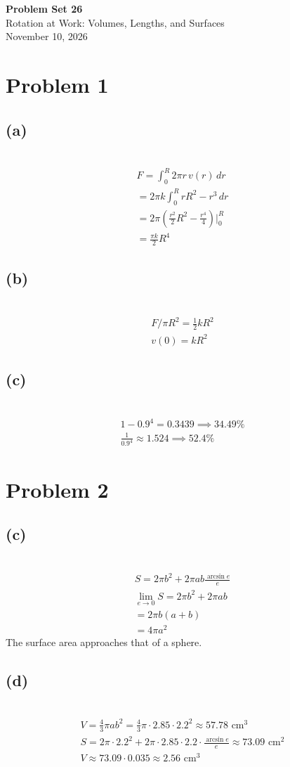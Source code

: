 \documentclass[12pt]{article}
\newcommand{\at}{\Big|}
\newcommand{\vem}{\vspace{0.5em}}
\newcommand{\problem}[1]{\section{Problem #1}}
\newcommand{\subproblem}[1]{\subsection{(#1)} \,}
\begin{document}
\vspace*{0cm}

\begin{center}
    {\Large \bfseries Problem Set 26} \\[0.5cm]
    {\large Rotation at Work: Volumes, Lengths, and Surfaces} \\[0.35cm]
    {\normalsize November 10, 2026}
\end{center}


\problem{1}

\subproblem{a}
\begin{gather*}
    F=\int_0^R 2\pi r \, v(r)\, dr\\
    = 2\pi k \int_0^R rR^2-r^3\, dr\\
    = 2\pi (\frac{r^2}{2}R^2-\frac{r^4}{4})\at_0^R\\
    = \boxed{\frac{\pi k}{2}R^4}
\end{gather*}

\subproblem{b}
\begin{gather*}
    F/\pi R^2 = \frac{1}{2}kR^2\\
    v(0)=kR^2 
\end{gather*}

\subproblem{c}
\begin{gather*}
    1-0.9^4=0.3439 \implies 34.49 \%\\
    \frac{1}{0.9^4} \approx 1.524 \implies 52.4\%
\end{gather*}

\problem{2}

\subproblem{c}
\begin{gather*}
    S = 2\pi b^2 + 2\pi ab \frac{\arcsin e}{e}\\
    \lim_{e \to 0} S = 2\pi b^2 + 2\pi ab  \\
    = 2\pi b(a+b)\\
    =\boxed{4\pi a^2}
\end{gather*}
The surface area approaches that of a sphere.\vem

\subproblem{d}
\begin{gather*}
    V = \frac{4}{3}\pi a b^2 = \frac{4}{3}\pi \cdot 2.85\cdot 2.2^2 \approx 57.78 \text{ cm}^3\\
    S = 2\pi \cdot 2.2^2 + 2\pi \cdot 2.85\cdot2.2 \cdot \frac{\arcsin e}{e} \approx 73.09 \text{ cm}^2\\
    V \approx 73.09  \cdot 0.035 \approx 2.56 \text{ cm}^3
\end{gather*}
\end{document}
